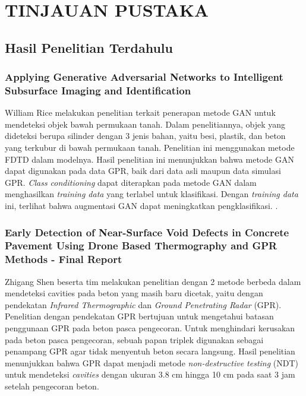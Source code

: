 \chapter{TINJAUAN PUSTAKA}
\label{chap:tinjauanpustaka}


\section{Hasil Penelitian Terdahulu}
\label{sec:hasilpenelitianterdahulu}

\subsection{Applying Generative Adversarial Networks to Intelligent Subsurface Imaging and Identification}
\label{sec:apllyingGANtoISII}

William Rice melakukan penelitian terkait penerapan metode GAN untuk mendeteksi objek bawah permukaan tanah. 
Dalam penelitiannya, objek yang dideteksi berupa silinder dengan 3 jenis bahan, yaitu besi, plastik, dan beton yang terkubur di bawah permukaan tanah. 
Penelitian ini menggunakan metode FDTD dalam modelnya. 
Hasil penelitian ini menunjukkan bahwa metode GAN dapat digunakan pada data GPR, baik dari data asli maupun data simulasi GPR. 
\emph{Class conditioning} dapat diterapkan pada metode GAN dalam menghasilkan \emph{training data} yang terlabel untuk klasifikasi.
Dengan \emph{training data} ini, terlihat bahwa augmentasi GAN dapat meningkatkan pengklasifikasi. \parencite{Rice2019ApplyingGA}.

\subsection{Early Detection of Near-Surface Void Defects in Concrete Pavement Using Drone Based Thermography and GPR Methods - Final Report}
\label{earlydetectionGPRmethod}

Zhigang Shen beserta tim melakukan penelitian dengan 2 metode berbeda dalam mendeteksi cavities pada beton yang masih baru dicetak, yaitu dengan pendekatan \emph{Infrared Thermographic} dan \emph{Ground Penetrating Radar} (GPR). 
Penelitian dengan pendekatan GPR bertujuan untuk mengetahui batasan penggunaan GPR pada beton pasca pengecoran. 
Untuk menghindari kerusakan pada beton pasca pengecoran, sebuah papan triplek digunakan sebagai penampang GPR agar tidak menyentuh beton secara langsung. 
Hasil penelitian menunjukkan bahwa GPR dapat menjadi metode \emph{non-destructive testing} (NDT) untuk mendeteksi \emph{cavities} dengan ukuran 3.8 cm hingga 10 cm pada saat 3 jam setelah pengecoran beton. \parencite{earlyDetectionofNearSurfaceVoidDefect}

